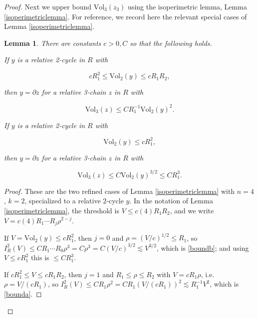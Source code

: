 \documentclass{amsart}
\newtheorem*{theorem 1}{Theorem 1}
\newtheorem*{theorem 2}{Theorem 2}
\newtheorem*{theorem 3}{Theorem 3}
\newtheorem{lemma}{Lemma}[section]
\numberwithin{equation}{section}
\newcommand{\Vol}{\textrm{Vol}}
\begin{document}
\begin{proof}
Next we upper bound $\Vol_3(z_3)$ using the isoperimetric lemma,  Lemma \ref{isoperimetriclemma}.   For reference,  we record here the relevant special cases of Lemma \ref{isoperimetriclemma}.   

\begin{lemma} \label{lemmaisoperimetric2} There are constants $c > 0, C$ so that the
following holds.

If $y$ is a relative 2-cycle in $R$ with 

\begin{equation} \label{casea} c R_1^2 \le \Vol_2(y) \le c R_1 R_2,  \end{equation}

then $y = \partial z$ for a relative 3-chain $z$ in $R$ with

\begin{equation} \label{bounda}  \Vol_3(z) \le C R_1^{-1} \Vol_2(y)^2.  \end{equation}

If $y$ is a relative 2-cycle in $R$ with

\begin{equation} \label{caseb} \Vol_2(y) \le c R_1^2,  \end{equation}

then $y = \partial z$ for a relative 3-chain $z$ in $R$ with

\begin{equation} \label{boundb}  \Vol_3(z) \le C \Vol_2(y)^{3/2} \le C R_1^3.  \end{equation}

\end{lemma}

\begin{proof} These are the two refined cases of
Lemma \ref{isoperimetriclemma} with $n = 4$, $k = 2$, specialized
to a relative $2$-cycle $y$.  In the notation of
Lemma \ref{isoperimetriclemma}, the threshold is $V \le c(4) R_1
R_2$, and we write $V = c(4) R_1 \cdots R_j \rho^{2-j}$.

If $V = \Vol_2(y) \le c R_1^2$, then $j = 0$ and $\rho =
(V/c)^{1/2} \le R_1$, so
$I_R^2(V) \le C R_1 \cdots R_0 \rho^{3} = C \rho^3 = C
(V/c)^{3/2} \lesssim V^{3/2}$, which is \eqref{boundb}; and using
$V \le c R_1^2$ this is $\le C R_1^3$.

If $c R_1^2 \le V \le c R_1 R_2$, then $j = 1$ and $R_1 \le \rho
\le R_2$ with $V = c R_1 \rho$, i.e. $\rho = V/(c R_1)$, so
$I_R^2(V) \le C R_1 \rho^{2} = C R_1 (V/(c R_1))^2 \lesssim R_1^{-1}
V^2$, which is \eqref{bounda}.
\end{proof}


\end{proof}
\end{document}
